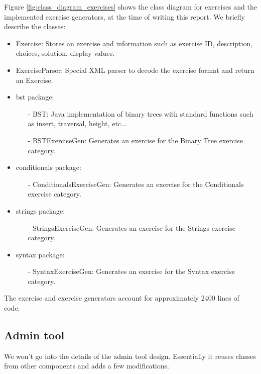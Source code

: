Figure \ref{fig:class_diagram_exercises} shows the class diagram for exercises and the implemented exercise generators, at the time of writing this report. We briefly describe the classes:
\begin{itemize}
\item \textsf{Exercise}: Stores an exercise and information such as exercise ID, description, choices, solution, display values.
\item \textsf{ExerciseParser}: Special XML parser to decode the exercise format and return an \textsf{Exercise}.
\item \textsf{bst} package:
      \begin{itemize}
      \item[-] \textsf{BST}: Java implementation of binary trees with standard functions such as insert, traversal, height, etc...
      \item[-] \textsf{BSTExerciseGen}: Generates an exercise for the Binary Tree exercise category.
      \end{itemize}
\item \textsf{conditionals} package:
      \begin{itemize}
      \item[-] \textsf{ConditionalsExerciseGen}: Generates an exercise for the Conditionals exercise category.
      \end{itemize}
\item \textsf{strings} package:
      \begin{itemize}
      \item[-] \textsf{StringsExerciseGen}: Generates an exercise for the Strings exercise category.
      \end{itemize}
\item \textsf{syntax} package:
      \begin{itemize}
      \item[-] \textsf{SyntaxExerciseGen}: Generates an exercise for the Syntax exercise category.
      \end{itemize}                 
\end{itemize}

The exercise and exercise generators account for approximately 2400 lines of code.

\subsection{Admin tool}
We won't go into the details of the admin tool design. Essentially it reuses classes from other components and adds a few modifications.\newline

